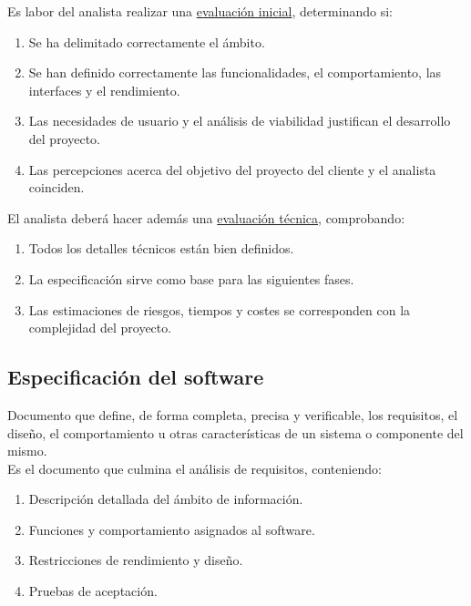 Es labor del analista realizar una \uline{evaluación inicial}, determinando si:
\begin{enumerate}
    \item Se ha delimitado correctamente el ámbito.
    \item Se han definido correctamente las funcionalidades, el comportamiento, las interfaces y el rendimiento.
    \item Las necesidades de usuario y el análisis de viabilidad justifican el desarrollo del proyecto.
    \item Las percepciones acerca del objetivo del proyecto del cliente y el analista coinciden.
\end{enumerate}
El analista deberá hacer además una \uline{evaluación técnica}, comprobando:
\begin{enumerate}
    \item Todos los detalles técnicos están bien definidos.
    \item La especificación sirve como base para las siguientes fases.
    \item Las estimaciones de riesgos, tiempos y costes se corresponden con la complejidad del proyecto.
\end{enumerate}


\subsection{Especificación del software}
Documento que define, de forma completa, precisa y verificable, los requisitos, el diseño, el comportamiento u otras características de un sistema o componente del mismo.\\
Es el documento que culmina el análisis de requisitos, conteniendo:
\begin{enumerate}
    \item Descripción detallada del ámbito de información.
    \item Funciones y comportamiento asignados al software.
    \item Restricciones de rendimiento y diseño.
    \item Pruebas de aceptación.
\end{enumerate}



